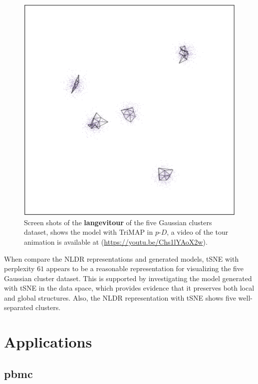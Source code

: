 \documentclass[
  12pt]{article}
\newcommand\pD{$p\text{-}D$}
\begin{document}
\begin{figure}[H]
%
\begin{minipage}{0.33\linewidth}
\includegraphics{figures/five_gau_clusters/sc_trimap_3.png}\end{minipage}%

\caption{\label{fig-gau5_sc}Screen shots of the \textbf{langevitour} of
the five Gaussian clusters dataset, shows the model with TriMAP in
\pD{}, a video of the tour animation is available at
(\url{https://youtu.be/Chs1lYAoX2w}).}

\end{figure}%

When compare the NLDR representations and generated models, tSNE with
perplexity \(61\) appears to be a reasonable representation for
visualizing the five Gaussian cluster dataset. This is supported by
investigating the model generated with tSNE in the data space, which
provides evidence that it preserves both local and global structures.
Also, the NLDR representation with tSNE shows five well-separated
clusters.

\section{Applications}\label{sec-applications}

\subsection{pbmc}\label{pbmc}
\end{document}
